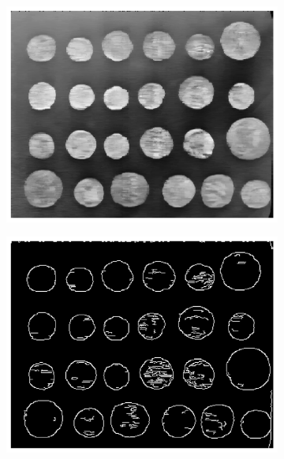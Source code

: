 \documentclass[11pt]{article}
\begin{document}
\begin{figure}[H]
    \centering
    \begin{subfigure}{.33\textwidth}
        \centering
        \includegraphics[width=\linewidth]{figs/q1c_init_median_filtered.png}
        \caption{}
    \end{subfigure}%
    \begin{subfigure}{.33\textwidth}
        \centering
        \includegraphics[width=\linewidth]{figs/q1c_canny_edges.png}
        \caption{}
    \end{subfigure}%
    \begin{subfigure}{.33\textwidth}

\end{subfigure}
\end{figure}
\end{document}
